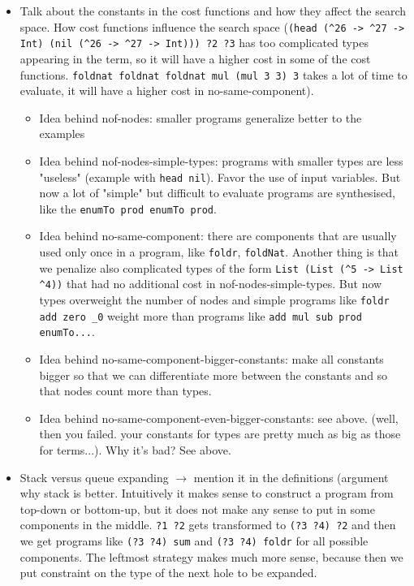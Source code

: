 \begin{itemize}
\begin{itemize}
\end{itemize} 
\item Talk about the constants in the cost functions and how they affect the search space.
How cost functions influence the search space (\lstinline!(head (^26 -> ^27 -> Int) (nil (^26 -> ^27 -> Int))) ?2 ?3! has too complicated types appearing in the term, so it will have a higher cost in some of the cost functions. \lstinline!foldnat foldnat foldnat mul (mul 3 3) 3! takes a lot of time to evaluate, it will have a higher cost in no-same-component).
\begin{itemize}
\item Idea behind nof-nodes: smaller programs generalize better to the examples
\item Idea behind nof-nodes-simple-types: programs with smaller types are less "useless" (example with \lstinline?head nil?). Favor the use of input variables. But now a lot of "simple" but difficult to evaluate programs are synthesised, like the \lstinline?enumTo prod enumTo prod?.
\item Idea behind no-same-component: there are components that are usually used only once in a program, like \lstinline?foldr?, \lstinline?foldNat?. Another thing is that we penalize also complicated types of the form \lstinline?List (List (^5 -> List ^4))? that had no additional cost in nof-nodes-simple-types. But now types overweight the number of nodes and simple programs like \lstinline?foldr add zero _0? weight more than programs like \lstinline?add mul sub prod enumTo...?.
\item Idea behind no-same-component-bigger-constants: make all constants bigger so that we can differentiate more between the constants and so that nodes count more than types.
\item Idea behind no-same-component-even-bigger-constants: see above. (well, then you failed. your constants for types are pretty much as big as those for terms...). Why it's bad? See above.
\end{itemize}
\item Stack versus queue expanding $\rightarrow$ mention it in the definitions (argument why stack is better. Intuitively it makes sense to construct a program from top-down or bottom-up, but it does not make any sense to put in some components in the middle. \lstinline!?1 ?2! gets transformed to \lstinline!(?3 ?4) ?2! and then we get programs like \lstinline!(?3 ?4) sum! and \lstinline!(?3 ?4) foldr! for all possible components. The leftmost strategy makes much more sense, because then we put constraint on the type of the next hole to be expanded.
\end{itemize}

